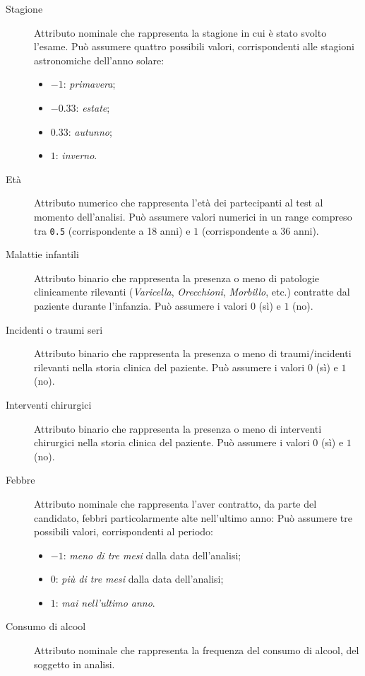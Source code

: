 \begin{description}
  \item[Stagione]
    Attributo nominale che rappresenta la stagione in cui è stato svolto l'esame.
    Può assumere quattro possibili valori, corrispondenti alle stagioni astronomiche dell'anno solare:
    \begin{itemize}
      \item \(-1\): \emph{primavera};
      \item \(-0.33\): \emph{estate};
      \item \(0.33\): \emph{autunno};
      \item \(1\): \emph{inverno}.
    \end{itemize}
  \item[Età]
    Attributo numerico che rappresenta l'età dei partecipanti al test al momento dell'analisi.
    Può assumere valori numerici in un range compreso tra \texttt{0.5} (corrispondente a 18 anni) e \(1\) (corrispondente a 36 anni).
  \item[Malattie infantili]
    Attributo binario che rappresenta la presenza o meno di patologie clinicamente rilevanti (\emph{Varicella}, \emph{Orecchioni}, \emph{Morbillo}, etc.) contratte dal paziente durante l'infanzia.
    Può assumere i valori \(0\) (sì) e \(1\) (no).
  \item[Incidenti o traumi seri]
    Attributo binario che rappresenta la presenza o meno di traumi/incidenti rilevanti nella storia clinica del paziente.
    Può assumere i valori \(0\) (sì) e \(1\) (no).
  \item[Interventi chirurgici]
    Attributo binario che rappresenta la presenza o meno di interventi chirurgici nella storia clinica del paziente.
    Può assumere i valori \(0\) (sì) e \(1\) (no).
  \item[Febbre]
    Attributo nominale che rappresenta l'aver contratto, da parte del candidato, febbri particolarmente alte nell'ultimo anno:
    Può assumere tre possibili valori, corrispondenti al periodo:
    \begin{itemize}
      \item \(-1\): \emph{meno di tre mesi} dalla data dell'analisi;
      \item \(0\): \emph{più di tre mesi} dalla data dell'analisi;
      \item \(1\): \emph{mai nell'ultimo anno}.
    \end{itemize}
  \item[Consumo di alcool]
    Attributo nominale che rappresenta la frequenza del consumo di alcool, del soggetto in analisi.

\end{description}
